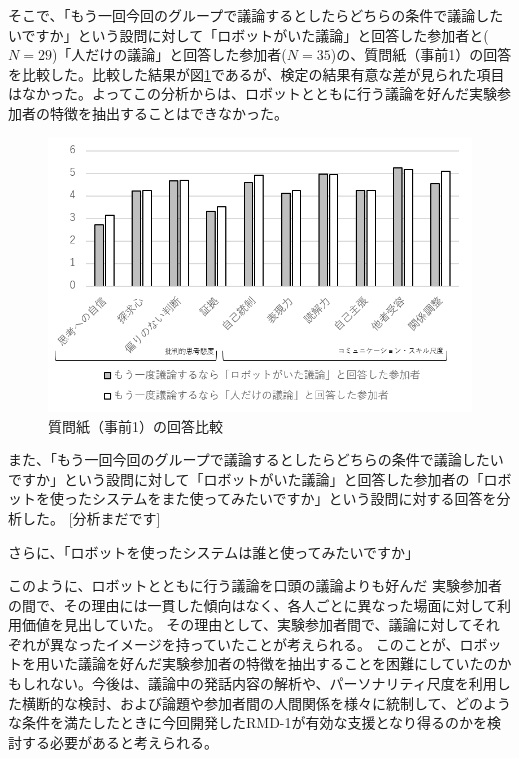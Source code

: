 \documentclass[11pt, a4paper]{jreport} %
\begin{document}
そこで、「もう一回今回のグループで議論するとしたらどちらの条件で議論したいですか」という設問に対して「ロボットがいた議論」と回答した参加者と($N=29$)「人だけの議論」と回答した参加者($N=35$)の、質問紙（事前1）の回答を比較した。比較した結果が図\ref{fig:jikken3_seikaku}であるが、検定の結果有意な差が見られた項目はなかった。よってこの分析からは、ロボットとともに行う議論を好んだ実験参加者の特徴を抽出することはできなかった。


\begin{figure}[htbp]
\begin{center}
\includegraphics[width=150mm]{images/jikken3_seikaku.png}
\caption{質問紙（事前1）の回答比較}
\label{fig:jikken3_seikaku}
\end{center}
\end{figure}



また、「もう一回今回のグループで議論するとしたらどちらの条件で議論したいですか」という設問に対して「ロボットがいた議論」と回答した参加者の「ロボットを使ったシステムをまた使ってみたいですか」という設問に対する回答を分析した。
[分析まだです]


さらに、「ロボットを使ったシステムは誰と使ってみたいですか」

このように、ロボットとともに行う議論を口頭の議論よりも好んだ
実験参加者の間で、その理由には一貫した傾向はなく、各人ごとに異なった場面に対して利用価値を見出していた。
その理由として、実験参加者間で、議論に対してそれぞれが異なったイメージを持っていたことが考えられる。
このことが、ロボットを用いた議論を好んだ実験参加者の特徴を抽出することを困難にしていたのかもしれない。今後は、議論中の発話内容の解析や、パーソナリティ尺度を利用した横断的な検討、および論題や参加者間の人間関係を様々に統制して、どのような条件を満たしたときに今回開発したRMD-1が有効な支援となり得るのかを検討する必要があると考えられる。
\end{document}
